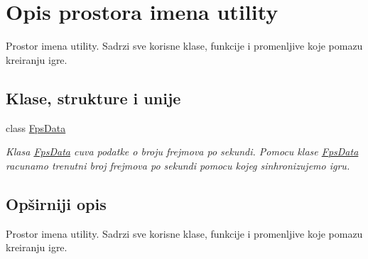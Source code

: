 \hypertarget{namespaceutility}{}\section{Opis prostora imena utility}
\label{namespaceutility}


Prostor imena utility. Sadrzi sve korisne klase, funkcije i promenljive koje pomazu kreiranju igre.  


\subsection*{Klase, strukture i unije}
\begin{DoxyCompactItemize}
\item 
class \hyperlink{classutility_1_1FpsData}{Fps\+Data}
\begin{DoxyCompactList}\small\item\em Klasa \hyperlink{classutility_1_1FpsData}{Fps\+Data} cuva podatke o broju frejmova po sekundi. Pomocu klase \hyperlink{classutility_1_1FpsData}{Fps\+Data} racunamo trenutni broj frejmova po sekundi pomocu kojeg sinhronizujemo igru. \end{DoxyCompactList}\end{DoxyCompactItemize}


\subsection{Opširniji opis}
Prostor imena utility. Sadrzi sve korisne klase, funkcije i promenljive koje pomazu kreiranju igre. 